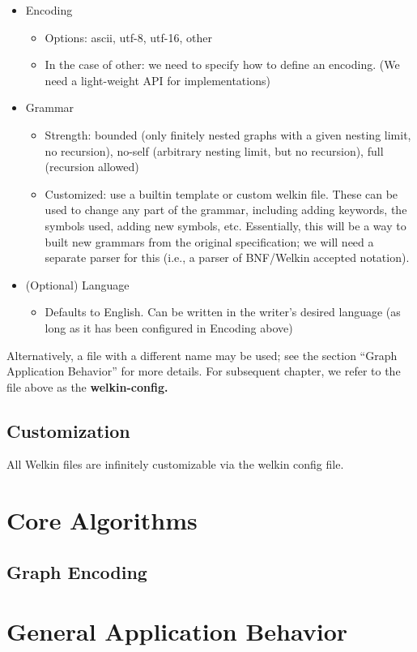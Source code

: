 \begin{itemize}
	\item Encoding
				\begin{itemize}
					\item Options: ascii, utf-8, utf-16, other
					\item In the case of other: we need to specify how to define an encoding. (We need a light-weight API for implementations)
				\end{itemize}
	\item Grammar
				\begin{itemize}
					\item Strength: bounded (only finitely nested graphs with a given nesting limit, no recursion), no-self (arbitrary nesting limit, but no recursion), full (recursion allowed)
					\item Customized: use a builtin template or custom welkin file. These can be used to change any part of the grammar, including adding keywords, the symbols used, adding new symbols, etc. Essentially, this will be a way to built new grammars from the original specification; we will need a separate parser for this (i.e., a parser of BNF/Welkin accepted notation).
				\end{itemize}

	\item (Optional) Language
				\begin{itemize}
					\item Defaults to English. Can be written in the writer's desired language (as long as it has been configured in Encoding above)
				\end{itemize}
\end{itemize}

Alternatively, a file with a different name may be used; see the section ``Graph Application Behavior'' for more details. For subsequent chapter, we refer to the file above as the \textbf{welkin-config.}

\subsection{Customization}
All Welkin files are infinitely customizable via the welkin config file.


\section{Core Algorithms}

\subsection{Graph Encoding}

\section{General Application Behavior}




\label{ch:spec}
